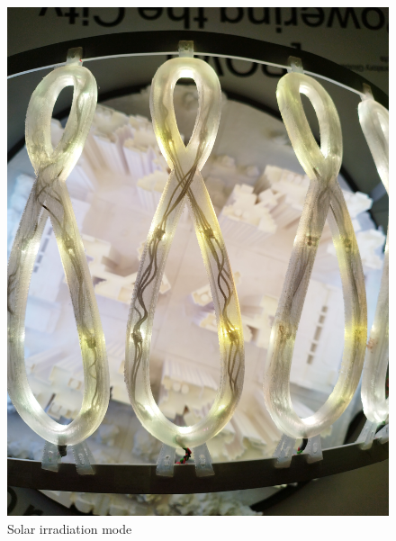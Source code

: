 \documentclass[a4paper,9pt]{article}
\begin{document}
    \begin{minipage}{0.48\linewidth}
         \begin{figure}[H]
        \centering
        \includegraphics[width=.9\linewidth, angle =180]{Images/e2.jpg}
        \caption{Solar irradiation mode}
 
    \end{figure}
\end{minipage}
\end{document}
